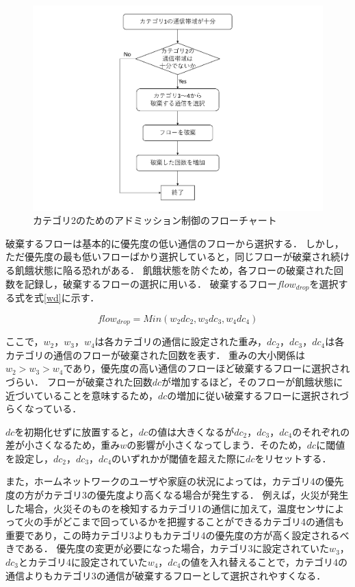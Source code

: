 \documentclass[a4paper,11pt,uplatex]{ujreport}
\begin{document}
  \begin{figure}[tb]
    \centering
    \includegraphics[width=\linewidth]{img/adomission_c2.pdf}
    \caption{カテゴリ2のためのアドミッション制御のフローチャート}
    \label{fig:adomission2}
  \end{figure}

  破棄するフローは基本的に優先度の低い通信のフローから選択する．
  しかし，ただ優先度の最も低いフローばかり選択していると，同じフローが破棄され続ける飢餓状態に陥る恐れがある．
  飢餓状態を防ぐため，各フローの破棄された回数を記録し，破棄するフローの選択に用いる．
  破棄するフロー$flow_{drop}$を選択する式を式\ref{wd}に示す．\par

  \begin{equation}
    flow_{drop} = Min(w_2 dc_2, w_3 dc_3, w_4 dc_4)
    \label{wd}
  \end{equation}

  ここで，$w_2$，$w_3$，$w_4$は各カテゴリの通信に設定された重み，$dc_2$，$dc_3$，$dc_4$は各カテゴリの通信のフローが破棄された回数を表す．
  重みの大小関係は$w_2 > w_3 > w_4$であり，優先度の高い通信のフローほど破棄するフローに選択されづらい．
  フローが破棄された回数$dc$が増加するほど，そのフローが飢餓状態に近づいていることを意味するため，$dc$の増加に従い破棄するフローに選択されづらくなっている．\par
  $dc$を初期化せずに放置すると，$dc$の値は大きくなるが$dc_2$，$dc_3$，$dc_4$のそれぞれの差が小さくなるため，重み$w$の影響が小さくなってしまう．そのため，$dc$に閾値を設定し，$dc_2$，$dc_3$，$dc_4$のいずれかが閾値を超えた際に$dc$をリセットする．\par
  また，ホームネットワークのユーザや家庭の状況によっては，カテゴリ4の優先度の方がカテゴリ3の優先度より高くなる場合が発生する．
  例えば，火災が発生した場合，火災そのものを検知するカテゴリ1の通信に加えて，温度センサによって火の手がどこまで回っているかを把握することができるカテゴリ4の通信も重要であり，この時カテゴリ3よりもカテゴリ4の優先度の方が高く設定されるべきである．
  優先度の変更が必要になった場合，カテゴリ3に設定されていた$w_3$，$dc_3$とカテゴリ4に設定されていた$w_4$，$dc_4$の値を入れ替えることで，カテゴリ4の通信よりもカテゴリ3の通信が破棄するフローとして選択されやすくなる．
\end{document}
